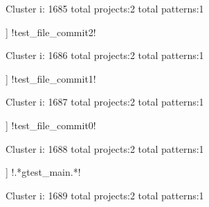 Cluster i: 1685
total projects:2
total patterns:1
\begin{multicols}{1}
\begin{description}[noitemsep,topsep=0pt]
\item [[2] ] \cverb!test_file_commit2!
\end{description}
\end{multicols}







Cluster i: 1686
total projects:2
total patterns:1
\begin{multicols}{1}
\begin{description}[noitemsep,topsep=0pt]
\item [[2] ] \cverb!test_file_commit1!
\end{description}
\end{multicols}







Cluster i: 1687
total projects:2
total patterns:1
\begin{multicols}{1}
\begin{description}[noitemsep,topsep=0pt]
\item [[2] ] \cverb!test_file_commit0!
\end{description}
\end{multicols}







Cluster i: 1688
total projects:2
total patterns:1
\begin{multicols}{1}
\begin{description}[noitemsep,topsep=0pt]
\item [[2] ] \cverb!.*gtest_main.*\n!
\end{description}
\end{multicols}







Cluster i: 1689
total projects:2
total patterns:1
\begin{multicols}{1}
\end{multicols}







